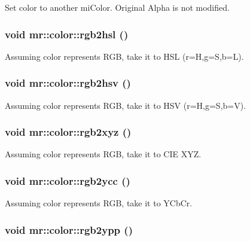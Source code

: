 Set color to another mi\-Color. Original Alpha is not modified. 

\subsubsection{\setlength{\rightskip}{0pt plus 5cm}void mr::color::rgb2hsl ()\hspace{0.3cm}{\tt  [inline]}}\label{structmr_1_1color_z0_5}


Assuming color represents RGB, take it to HSL (r=H,g=S,b=L). 

\subsubsection{\setlength{\rightskip}{0pt plus 5cm}void mr::color::rgb2hsv ()\hspace{0.3cm}{\tt  [inline]}}\label{structmr_1_1color_z0_3}


Assuming color represents RGB, take it to HSV (r=H,g=S,b=V). 

\subsubsection{\setlength{\rightskip}{0pt plus 5cm}void mr::color::rgb2xyz ()\hspace{0.3cm}{\tt  [inline]}}\label{structmr_1_1color_z0_1}


Assuming color represents RGB, take it to CIE XYZ. 

\subsubsection{\setlength{\rightskip}{0pt plus 5cm}void mr::color::rgb2ycc ()\hspace{0.3cm}{\tt  [inline]}}\label{structmr_1_1color_z0_7}


Assuming color represents RGB, take it to YCb\-Cr. 

\subsubsection{\setlength{\rightskip}{0pt plus 5cm}void mr::color::rgb2ypp ()\hspace{0.3cm}{\tt  [inline]}}\label{structmr_1_1color_z0_9}


